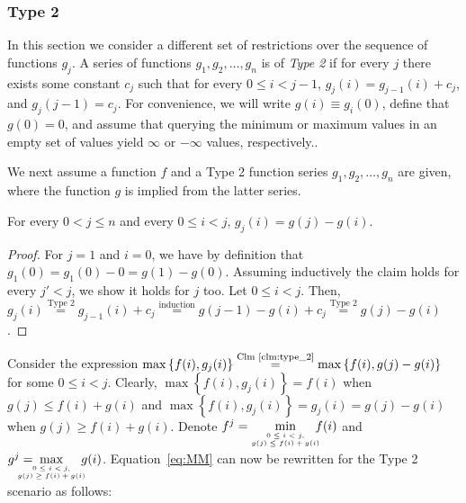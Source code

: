 \subsubsection{Type 2}
In this section we consider a different set of restrictions over the sequence of functions $g_j$. 
A series of functions $g_1, g_2, \ldots, g_n$ is of \emph{Type 2} if for every $j$ there exists some constant $c_j$ such that for every $0 \leq i < j-1$, $g_j(i) = g_{j-1}(i) + c_j$, and $g_j(j-1) = c_j$. For convenience, we will write $g(i) \equiv g_i(0)$, define that $g(0) = 0$, and assume that querying the minimum or maximum values in an empty set of values yield $\infty$ or $-\infty$ values, respectively..

We next assume a function $f$ and a Type 2 function series $g_1, g_2, \ldots, g_n$ are given, where the function $g$ is implied from the latter series. 

\begin{claim}
\label{clm:type_2}
	For every $0 < j \leq n$ and every $0 \leq i < j$, $g_j(i) = g(j) - g(i)$.
\end{claim} 

\begin{proof}
	For $j=1$ and $i=0$, we have by definition that $g_1(0) = g_1(0) - 0 = g(1) - g(0)$. 
	Assuming inductively the claim holds for every $j' < j$, we show it holds for $j$ too. Let $0 \leq i < j$. Then,
	$g_j(i) \stackrel{\text{Type 2}}{=} g_{j-1}(i) + c_j \stackrel{\text{induction}}{=} g(j-1) - g(i) + c_j \stackrel{\text{Type 2}}{=} g(j) - g(i)$.
\end{proof}

Consider the expression $\max\left\{f(i), g_j(i)\right\} \stackrel{\text{Clm~\ref{clm:type_2}}}{=} \max\left\{f(i), g(j) - g(i)\right\}$ for some $0 \leq i < j$. Clearly, $\max\left\{f(i), g_j(i)\right\} = f(i)$ when $g(j) \leq f(i) + g(i)$ and $\max\left\{f(i), g_j(i)\right\} = g_j(i) = g(j) - g(i)$ when $g(j) \geq f(i) + g(i)$. Denote $f^j = \hspace{-.5em}\min\limits_{{\tiny\begin{array}{c}
		0 \leq i < j, \\
		g(j) \leq f(i) + g(i)
		\end{array}}} \hspace{-1em} f(i)$
and $g^j = \hspace{-2em}\max\limits_{{\tiny\begin{array}{c}
		0 \leq i < j, \\
		g(j) \geq f(i) + g(i)
		\end{array}}} \hspace{-1em} g(i)$. Equation~\ref{eq:MM} can now be rewritten for the Type 2 scenario as follows:

